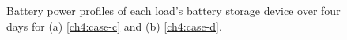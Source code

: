 \begin{figure}\centering
	\caption{Battery power profiles of each load's battery storage device over four days for (a) \ref{ch4:case-c} and (b) \ref{ch4:case-d}.}
	\label{ch4:fig:storage-aimd}
\end{figure}

